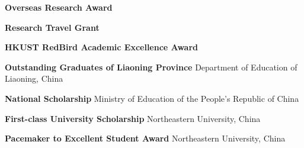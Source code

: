 %
%
%


\begin{scholarship}
	{\textbf{Overseas Research Award}}

	{\textbf{Research Travel Grant}}

	{\textbf{HKUST RedBird Academic Excellence Award}}

	{\textbf{Outstanding Graduates of Liaoning Province}}
	\scholarshipentry{}
	{Department of Education of Liaoning, China}

	{\textbf{National Scholarship}}
	\scholarshipentry{}
	{Ministry of Education of the People's Republic of China}

	{\textbf{First-class University Scholarship}}
	\scholarshipentry{}
	{Northeastern University, China}

	{\textbf{Pacemaker to Excellent Student Award}}
	\scholarshipentry{}
	{Northeastern University, China}

\end{scholarship}
